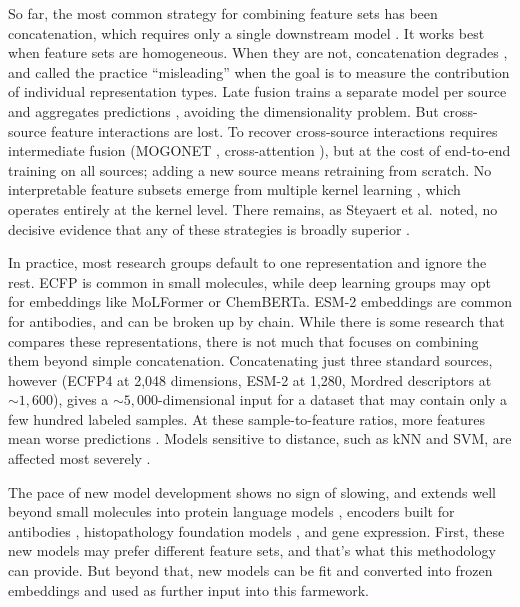 So far, the most common strategy for combining feature sets has been concatenation, which requires only a single downstream model \citep{Stahlschmidt2022}. It works best when feature sets are homogeneous. When they are not, concatenation degrades \citep{Stahlschmidt2022}, and \cite{Deng2023} called the practice ``misleading'' when the goal is to measure the contribution of individual representation types. Late fusion trains a separate model per source and aggregates predictions \citep{Steyaert2023}, avoiding the dimensionality problem. But cross-source feature interactions are lost. To recover cross-source interactions requires intermediate fusion (MOGONET \citep{Wang2021}, cross-attention \citep{Zhang2024}), but at the cost of end-to-end training on all sources; adding a new source means retraining from scratch. No interpretable feature subsets emerge from multiple kernel learning \citep{Gonen2011}, which operates entirely at the kernel level. There remains, as Steyaert et al.\ noted, no decisive evidence that any of these strategies is broadly superior \citep{Steyaert2023}.

In practice, most research groups default to one representation and ignore the rest. ECFP is common in small molecules, while deep learning groups may opt for embeddings like MoLFormer or ChemBERTa. ESM-2 embeddings are common for antibodies, and can be broken up by chain. While there is some research that compares these representations, there is not much that focuses on combining them beyond simple concatenation. Concatenating just three standard sources, however (ECFP4 at 2,048 dimensions, ESM-2 at 1,280, Mordred descriptors at ${\sim}1{,}600$), gives a ${\sim}5{,}000$-dimensional input for a dataset that may contain only a few hundred labeled samples. At these sample-to-feature ratios, more features mean worse predictions \citep{Hughes1968, Bellman1961}. Models sensitive to distance, such as kNN and SVM, are affected most severely \citep{FernandezDelgado2014}.

The pace of new model development shows no sign of slowing, and extends well beyond small molecules into protein language models \citep{Lin2023, Elnaggar2022}, encoders built for antibodies \citep{Ruffolo2021AntiBERTy, Olsen2022}, histopathology foundation models \citep{ElNahhas2025}, and gene expression. First, these new models may prefer different feature sets, and that's what this methodology can provide. But beyond that, new models can be fit and converted into frozen embeddings and used as further input into this farmework. 

